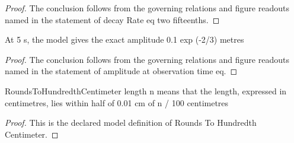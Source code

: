 \begin{proof}
  The conclusion follows from the governing relations and figure readouts named in the statement of decay Rate eq two fifteenths.
\end{proof}
\begin{theorem}
  \label{thm:physics:phyx-mini-0979:phyxminiproblems-problemphyxmini0979-amplitude-at-observation-time-eq}
  At 5 s, the model gives the exact amplitude 0.1 exp (-2/3) metres
\end{theorem}
\begin{proof}
  The conclusion follows from the governing relations and figure readouts named in the statement of amplitude at observation time eq.
\end{proof}
\begin{definition}
  \label{def:physics:phyx-mini-0979:phyxminiproblems-problemphyxmini0979-roundstohundredthcentimeter}
  RoundsToHundredthCentimeter length n means that the length, expressed in centimetres, lies within half of 0.01 cm of n / 100 centimetres
\end{definition}
\begin{proof}
  This is the declared model definition of Rounds To Hundredth Centimeter.
\end{proof}
